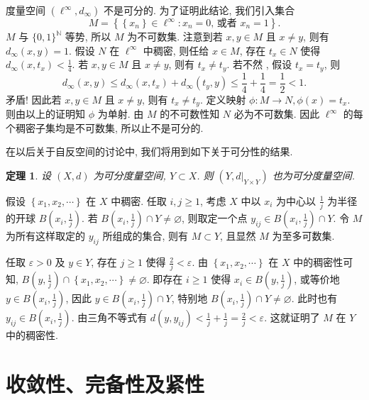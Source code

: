 \documentclass[openany]{ctexbook}
\makeatletter
\theoremstyle{kaiti}
\newtheorem{theorem}{定理}[section]
\theoremstyle{normal}
\renewenvironment{proof}[1][\proofname]{\par
    \pushQED{\qed}%
    \normalfont \topsep6\p@\@plus6\p@\relax
    \trivlist
    \item\relax
    {\heiti #1}\hspace{2\labelsep}\ignorespaces
  }{%
    \popQED\endtrivlist\@endpefalse
  }
\makeatother
\begin{document}
度量空间 $\left(\ell^{\infty}, d_{\infty}\right)$ 不是可分的. 为了证明此结论, 我们引入集合
$$
M=\left\{\left\{x_n\right\} \in \ell^{\infty}: x_n=0 \text {, 或者 } x_n=1\right\}.
$$
$M$ 与 $\{0,1\}^{\mathbb{N}}$ 等势, 所以 $M$ 为不可数集. 注意到若 $x, y \in M$ 且 $x \neq y$, 则有 $d_{\infty}(x, y)=1$. 假设 $N$ 在 $\ell^{\infty}$ 中稠密, 则任给 $x \in M$, 存在 $t_{x} \in N$ 使得 $d_{\infty}\left(x, t_{x}\right)<\frac{1}{4}$. 若 $x, y \in M$ 且 $x \neq y$, 则有 $t_{x} \neq t_{y}$. 若不然 , 假设 $t_{x}=t_{y}$, 则
$$
d_{\infty}(x, y) \leqslant d_{\infty}\left(x, t_{x}\right)+d_{\infty}\left(t_{y}, y\right) \leqslant \frac{1}{4}+\frac{1}{4}=\frac{1}{2}<1.
$$
矛盾! 因此若 $x, y \in M$ 且 $x \neq y$, 则有 $t_{x} \neq t_{y}$. 定义映射 $\phi: M \rightarrow N, \phi(x)=t_{x}$. 则由以上的证明知 $\phi$ 为单射. 由 $M$ 的不可数性知 $N$ 必为不可数集. 因此 $\ell^{\infty}$ 的每个稠密子集均是不可数集, 所以止不是可分的.

在以后关于自反空间的讨论中, 我们将用到如下关于可分性的结果.

\begin{theorem}
  设 $(X, d)$ 为可分度量空间, $Y \subset X$. 则 $\left(Y,\left.d\right|_{Y \times Y}\right)$ 也为可分度量空间. 
\end{theorem}

\begin{proof}
假设 $\left\{x_1, x_2, \cdots\right\}$ 在 $X$ 中稠密. 任取 $i, j \geqslant 1$, 考虑 $X$ 中以 $x_{i}$ 为中心以 $\frac{1}{j}$ 为半径的开球 $B\left(x_{i}, \frac{1}{j}\right)$. 若 $B\left(x_{i}, \frac{1}{j}\right) \cap Y \neq \varnothing$, 则取定一个点 $y_{i j} \in B\left(x_{i}, \frac{1}{j}\right) \cap Y$. 令 $M$ 为所有这样取定的 $y_{i j}$ 所组成的集合, 则有 $M \subset Y$, 且显然 $M$ 为至多可数集.

任取 $\varepsilon>0$ 及 $y \in Y$, 存在 $j \geqslant 1$ 使得 $\frac{2}{j}<\varepsilon$. 由 $\left\{x_1, x_2, \cdots\right\}$ 在 $X$ 中的稠密性可知, $B\left(y, \frac{1}{j}\right) \cap\left\{x_1, x_2, \cdots\right\} \neq \varnothing$. 即存在 $i \geqslant 1$ 使得 $x_{i} \in B\left(y, \frac{1}{j}\right)$, 或等价地 $y \in B\left(x_{i}, \frac{1}{j}\right)$, 因此 $y \in B\left(x_{i}, \frac{1}{j}\right) \cap Y$, 特别地 $B\left(x_{i}, \frac{1}{j}\right) \cap Y \neq \varnothing$. 此时也有 $y_{i j} \in B\left(x_{i}, \frac{1}{j}\right)$. 由三角不等式有 $d\left(y, y_{i j}\right)<\frac{1}{j}+\frac{1}{j}=\frac{2}{j}<\varepsilon$. 这就证明了 $M$ 在 $Y$ 中的稠密性.
\end{proof}

\section{收敛性、完备性及紧性}
\end{document}
